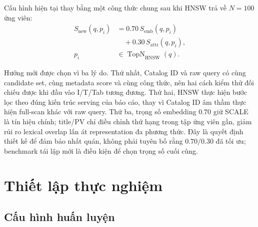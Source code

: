 \documentclass[10pt,conference]{IEEEtran}
\begin{document}
Cấu hình hiện tại thay bằng một công thức chung sau khi HNSW trả về $N=100$ ứng viên:
\begin{equation}
\begin{aligned}
S_{\mathrm{new}}(q,p_i) &= 0.70\,S_{\mathrm{emb}}(q,p_i) \\
&\quad + 0.30\,S_{\mathrm{attr}}(q,p_i), \\
p_i &\in \operatorname{TopN}_{\mathrm{HNSW}}(q).
\end{aligned}
\end{equation}

Hướng mới được chọn vì ba lý do. Thứ nhất, Catalog ID và raw query có cùng candidate set, cùng metadata score và cùng công thức, nên hai cách kiểm thử đối chiếu được khi đầu vào I/T/Tab tương đương. Thứ hai, HNSW thực hiện bước lọc theo đúng kiến trúc serving của báo cáo, thay vì Catalog ID âm thầm thực hiện full-scan khác với raw query. Thứ ba, trọng số embedding $0.70$ giữ SCALE là tín hiệu chính; title/PV chỉ điều chỉnh thứ hạng trong tập ứng viên gần, giảm rủi ro lexical overlap lấn át representation đa phương thức. Đây là quyết định thiết kế để đảm bảo nhất quán, không phải tuyên bố rằng $0.70/0.30$ đã tối ưu; benchmark tái lập mới là điều kiện để chọn trọng số cuối cùng.



\section{Thiết lập thực nghiệm}

\subsection{Cấu hình huấn luyện}
\end{document}

